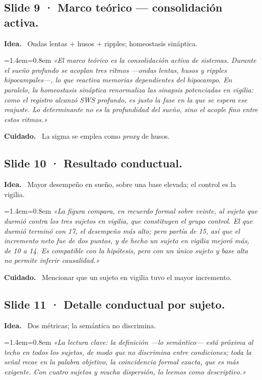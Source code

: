 \documentclass[11pt,a4paper]{article}
\newenvironment{guion}%
{\par\smallskip\begingroup\leftskip=1.4em\rightskip=0.8em\color{ink}\itshape}%
{\par\endgroup\smallskip}
\newcommand{\lab}[1]{\textbf{\color{ink}#1}\ }
\begin{document}
\subsection{Slide 9 · Marco teórico — consolidación activa.}
\lab{Idea.} Ondas lentas $+$ husos $+$ ripples; homeostasis sináptica.
\begin{guion}
«El marco teórico es la consolidación activa de sistemas. Durante el sueño profundo se acoplan tres
ritmos —ondas lentas, husos y ripples hipocampales—, lo que reactiva memorias dependientes del
hipocampo. En paralelo, la homeostasis sináptica renormaliza las sinapsis potenciadas en vigilia: como
el registro alcanzó SWS profundo, es justo la fase en la que se espera ese reajuste. Lo determinante no
es la profundidad del sueño, sino el acople fino entre estos ritmos.»
\end{guion}
\lab{Cuidado.} La sigma se emplea como \emph{proxy} de husos.

\subsection{Slide 10 · Resultado conductual.}
\lab{Idea.} Mayor desempeño en sueño, sobre una base elevada; el control es la vigilia.
\begin{guion}
«La figura compara, en recuerdo formal sobre veinte, al sujeto que durmió contra los tres sujetos en
vigilia, que constituyen el grupo control. El que durmió terminó con 17, el desempeño más alto; pero
partía de 15, así que el incremento neto fue de dos puntos, y de hecho un sujeto en vigilia mejoró más,
de 10 a 14. Es compatible con la hipótesis, pero con un único sujeto y base alta no permite inferir
causalidad.»
\end{guion}
\lab{Cuidado.} Mencionar que un sujeto en vigilia tuvo el mayor incremento.

\subsection{Slide 11 · Detalle conductual por sujeto.}
\lab{Idea.} Dos métricas; la semántica no discrimina.
\begin{guion}
«La lectura clave: la definición —lo semántico— está próxima al techo en todos los sujetos, de modo que
no discrimina entre condiciones; toda la señal recae en la palabra objetivo, la coincidencia formal
exacta, que es más exigente. Con cuatro sujetos y mucha dispersión, lo leemos como descriptivo.»
\end{guion}
\end{document}
